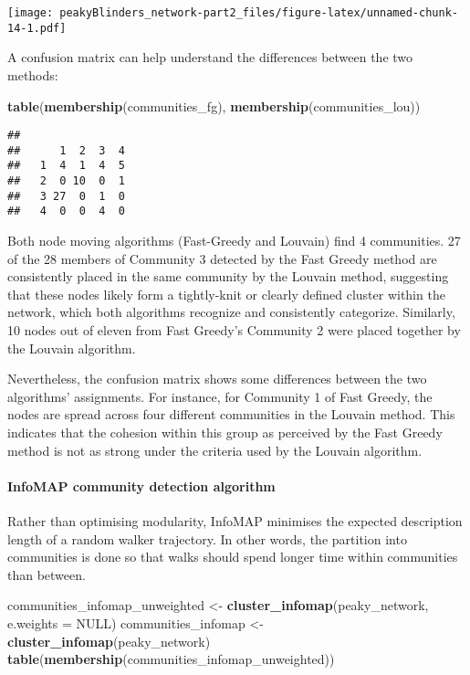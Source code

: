 \documentclass[
]{article}
\newenvironment{Shaded}{\begin{snugshade}}{\end{snugshade}}
\newcommand{\AttributeTok}[1]{\textcolor[rgb]{0.13,0.29,0.53}{#1}}
\newcommand{\ConstantTok}[1]{\textcolor[rgb]{0.56,0.35,0.01}{#1}}
\newcommand{\FunctionTok}[1]{\textcolor[rgb]{0.13,0.29,0.53}{\textbf{#1}}}
\newcommand{\NormalTok}[1]{#1}
\newcommand{\OtherTok}[1]{\textcolor[rgb]{0.56,0.35,0.01}{#1}}
\begin{document}
\texttt{[image: peakyBlinders\_network-part2\_files/figure-latex/unnamed-chunk-14-1.pdf]}

A confusion matrix can help understand the differences between the two
methods:

\begin{Shaded}
\begin{Highlighting}[]
\FunctionTok{table}\NormalTok{(}\FunctionTok{membership}\NormalTok{(communities\_fg), }\FunctionTok{membership}\NormalTok{(communities\_lou))}
\end{Highlighting}
\end{Shaded}

\begin{verbatim}
##    
##      1  2  3  4
##   1  4  1  4  5
##   2  0 10  0  1
##   3 27  0  1  0
##   4  0  0  4  0
\end{verbatim}

Both node moving algorithms (Fast-Greedy and Louvain) find 4
communities. 27 of the 28 members of Community 3 detected by the Fast
Greedy method are consistently placed in the same community by the
Louvain method, suggesting that these nodes likely form a tightly-knit
or clearly defined cluster within the network, which both algorithms
recognize and consistently categorize. Similarly, 10 nodes out of eleven
from Fast Greedy's Community 2 were placed together by the Louvain
algorithm.

Nevertheless, the confusion matrix shows some differences between the
two algorithms' assignments. For instance, for Community 1 of Fast
Greedy, the nodes are spread across four different communities in the
Louvain method. This indicates that the cohesion within this group as
perceived by the Fast Greedy method is not as strong under the criteria
used by the Louvain algorithm.

\hypertarget{infomap-community-detection-algorithm}{%
\paragraph{InfoMAP community detection
algorithm}\label{infomap-community-detection-algorithm}}

Rather than optimising modularity, InfoMAP minimises the expected
description length of a random walker trajectory. In other words, the
partition into communities is done so that walks should spend longer
time within communities than between.

\begin{Shaded}
\begin{Highlighting}[]
\NormalTok{communities\_infomap\_unweighted }\OtherTok{\textless{}{-}} \FunctionTok{cluster\_infomap}\NormalTok{(peaky\_network, }\AttributeTok{e.weights =} \ConstantTok{NULL}\NormalTok{)}
\NormalTok{communities\_infomap }\OtherTok{\textless{}{-}} \FunctionTok{cluster\_infomap}\NormalTok{(peaky\_network)}
\FunctionTok{table}\NormalTok{(}\FunctionTok{membership}\NormalTok{(communities\_infomap\_unweighted))}
\end{Highlighting}
\end{Shaded}
\end{document}
